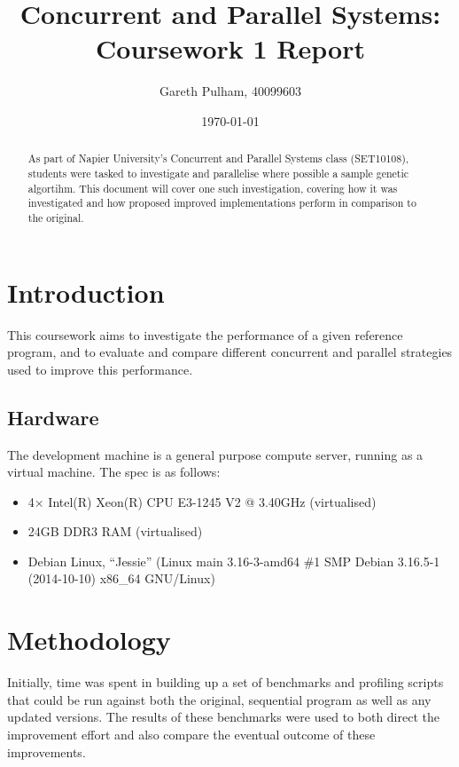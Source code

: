 \documentclass[a4paper]{article}
\begin{document}
    \begin{titlepage}
        \title{Concurrent and Parallel Systems: Coursework 1 Report}
        \author{Gareth Pulham, 40099603}
        \date{\today}
        \maketitle
        \thispagestyle{empty}
        \begin{abstract}
            As part of Napier University's Concurrent and Parallel Systems class (SET10108), students were tasked to
            investigate and parallelise where possible a sample genetic algortihm. This document will cover one such
            investigation, covering how it was investigated and how proposed improved implementations perform in
            comparison to the original.
        \end{abstract}
    \end{titlepage}

    \tableofcontents

    \section{Introduction}
    This coursework aims to investigate the performance of a given reference program, and to evaluate and compare
    different concurrent and parallel strategies used to improve this performance.

        \subsection{Hardware}
        The development machine is a general purpose compute server, running as a virtual machine. The spec is as
        follows:
        \begin{itemize}
            \item 4$\times$ Intel(R) Xeon(R) CPU E3-1245 V2 @ 3.40GHz (virtualised)
            \item 24GB DDR3 RAM (virtualised)
            \item Debian Linux, ``Jessie'' (Linux main 3.16-3-amd64 \#1 SMP Debian 3.16.5-1 (2014-10-10) x86\_64 GNU/Linux)
        \end{itemize}

    \section{Methodology}
    Initially, time was spent in building up a set of benchmarks and profiling scripts that could be run against both
    the original, sequential program as well as any updated versions. The results of these benchmarks were used to both
    direct the improvement effort and also compare the eventual outcome of these improvements.
\end{document}
